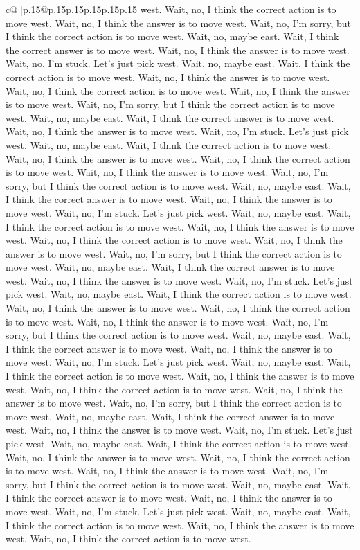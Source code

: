 \documentclass{article}
\begin{document}
{\begin{supertabular}{c@{$\;$}|p{.15\linewidth}@{}p{.15\linewidth}p{.15\linewidth}p{.15\linewidth}p{.15\linewidth}p{.15\linewidth}}
{{{west. Wait, no, I think the correct action is to move west. Wait, no, I think the answer is to move west. Wait, no, I'm sorry, but I think the correct action is to move west. Wait, no, maybe east. Wait, I think the correct answer is to move west. Wait, no, I think the answer is to move west. Wait, no, I'm stuck. Let's just pick west. Wait, no, maybe east. Wait, I think the correct action is to move west. Wait, no, I think the answer is to move west. Wait, no, I think the correct action is to move west. Wait, no, I think the answer is to move west. Wait, no, I'm sorry, but I think the correct action is to move west. Wait, no, maybe east. Wait, I think the correct answer is to move west. Wait, no, I think the answer is to move west. Wait, no, I'm stuck. Let's just pick west. Wait, no, maybe east. Wait, I think the correct action is to move west. Wait, no, I think the answer is to move west. Wait, no, I think the correct action is to move west. Wait, no, I think the answer is to move west. Wait, no, I'm sorry, but I think the correct action is to move west. Wait, no, maybe east. Wait, I think the correct answer is to move west. Wait, no, I think the answer is to move west. Wait, no, I'm stuck. Let's just pick west. Wait, no, maybe east. Wait, I think the correct action is to move west. Wait, no, I think the answer is to move west. Wait, no, I think the correct action is to move west. Wait, no, I think the answer is to move west. Wait, no, I'm sorry, but I think the correct action is to move west. Wait, no, maybe east. Wait, I think the correct answer is to move west. Wait, no, I think the answer is to move west. Wait, no, I'm stuck. Let's just pick west. Wait, no, maybe east. Wait, I think the correct action is to move west. Wait, no, I think the answer is to move west. Wait, no, I think the correct action is to move west. Wait, no, I think the answer is to move west. Wait, no, I'm sorry, but I think the correct action is to move west. Wait, no, maybe east. Wait, I think the correct answer is to move west. Wait, no, I think the answer is to move west. Wait, no, I'm stuck. Let's just pick west. Wait, no, maybe east. Wait, I think the correct action is to move west. Wait, no, I think the answer is to move west. Wait, no, I think the correct action is to move west. Wait, no, I think the answer is to move west. Wait, no, I'm sorry, but I think the correct action is to move west. Wait, no, maybe east. Wait, I think the correct answer is to move west. Wait, no, I think the answer is to move west. Wait, no, I'm stuck. Let's just pick west. Wait, no, maybe east. Wait, I think the correct action is to move west. Wait, no, I think the answer is to move west. Wait, no, I think the correct action is to move west. Wait, no, I think the answer is to move west. Wait, no, I'm sorry, but I think the correct action is to move west. Wait, no, maybe east. Wait, I think the correct answer is to move west. Wait, no, I think the answer is to move west. Wait, no, I'm stuck. Let's just pick west. Wait, no, maybe east. Wait, I think the correct action is to move west. Wait, no, I think the answer is to move west. Wait, no, I think the correct action is to move west. }}}
\end{supertabular}}
\end{document}
